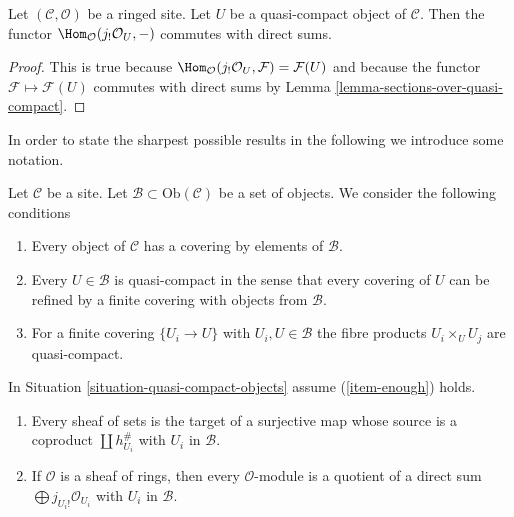 \begin{lemma}
\label{lemma-quasi-compact-hom-from}
Let $(\mathcal{C}, \mathcal{O})$ be a ringed site. Let $U$ be a quasi-compact
object of $\mathcal{C}$. Then the functor
$\Hom_\mathcal{O}(j_!\mathcal{O}_U, -)$ commutes with direct sums.
\end{lemma}

\begin{proof}
This is true because
$\Hom_\mathcal{O}(j_!\mathcal{O}_U, \mathcal{F}) = \mathcal{F}(U)$
and because the functor $\mathcal{F} \mapsto \mathcal{F}(U)$
commutes with direct sums by
Lemma \ref{lemma-sections-over-quasi-compact}.
\end{proof}

\noindent
In order to state the sharpest possible results in the following
we introduce some notation.

\begin{situation}
\label{situation-quasi-compact-objects}
Let $\mathcal{C}$ be a site. Let
$\mathcal{B} \subset \text{Ob}(\mathcal{C})$ be a set
of objects. We consider the following conditions
\begin{enumerate}
\item
\label{item-enough}
Every object of $\mathcal{C}$ has a covering by elements of $\mathcal{B}$.
\item
\label{item-enough-qc}
Every $U \in \mathcal{B}$ is quasi-compact in the sense that
every covering of $U$ can be refined by a finite covering with
objects from $\mathcal{B}$.
\item
\label{item-enough-qc-qs}
For a finite covering $\{U_i \to U\}$ with $U_i, U \in \mathcal{B}$
the fibre products $U_i \times_U U_j$ are quasi-compact.
\end{enumerate}
\end{situation}

\begin{lemma}
\label{lemma-module-quotient-direct-sum}
In Situation \ref{situation-quasi-compact-objects} assume
(\ref{item-enough}) holds.
\begin{enumerate}
\item Every sheaf of sets is the target of a surjective map
whose source is a coproduct $\coprod h_{U_i}^\#$ with $U_i$ in $\mathcal{B}$.
\item If $\mathcal{O}$ is a sheaf of rings, then every $\mathcal{O}$-module
is a quotient of a direct sum $\bigoplus\nolimits j_{U_i!}\mathcal{O}_{U_i}$
with $U_i$ in $\mathcal{B}$.
\end{enumerate}
\end{lemma}

